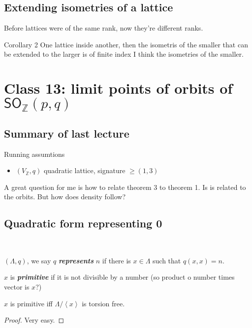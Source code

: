 \subsection{Extending isometries of a lattice}

Before lattices were of the same rank, now they're different ranks.

\begin{idea4}{Corollary 2}\leavevmode
	One lattice inside another, then the isometris of the smaller that can be extended to the larger is of finite index I think the isometries of the smaller.
\end{idea4}

\section{Class 13: limit points of orbits of $\mathsf{SO}_{\mathbb{Z}}(p,q)$}

\subsection{Summary of last lecture}

Running assumtions
\begin{itemize}
\item $(V_{\mathbb{Z}},q)$ quadratic lattice, signature   $\geq (1,3)$
\end{itemize}

A great question for me is how to relate theorem 3 to theorem 1. Is is related to the orbits. But how does density follow?

\subsection{Quadratic form representing 0}
\
\begin{defn}\leavevmode
	 $(\Lambda,q)$, we say $q$ \textit{\textbf{represents}} $n$ if there is $x\in\Lambda$ such that $q(x,x)=n$.

	  $x$ is  \textit{\textbf{primitive}} if it is not divisible by a number (so product o number times vector is  $x$?)
\end{defn}

\begin{remark}\leavevmode
	$x$ is primitive iff $\Lambda/\left<x\right> $ is torsion free.
\end{remark}
\begin{proof}\leavevmode
	Very easy.
\end{proof}

